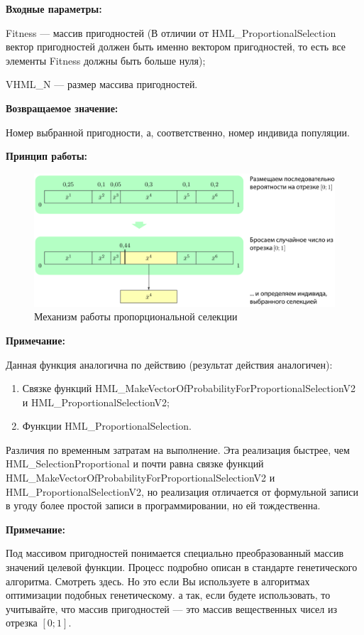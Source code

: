\textbf{Входные параметры:}
 
  Fitness --- массив пригодностей (В отличии от HML\_ProportionalSelection вектор пригодностей должен быть именно вектором пригодностей, то есть все элементы Fitness должны быть больше нуля);
  
 VHML\_N --- размер массива пригодностей.

\textbf{Возвращаемое значение:} 

Номер выбранной пригодности, а, соответственно, номер индивида популяции.

 \textbf{Принцип работы:}

\begin{figure} [h]
  \center
  \includegraphics [scale=0.8] {HML_ProportionalSelection_Sheme}
  \caption{Механизм работы пропорциональной селекции} 
  \label{img:HML_ProportionalSelection_Sheme}  
\end{figure}

\textbf{Примечание:}

Данная функция аналогична по действию (результат действия аналогичен):
 
 \begin{enumerate}
\item Связке функций HML\_MakeVectorOfProbabilityForProportionalSelectionV2 и HML\_ProportionalSelectionV2;
\item Функции HML\_ProportionalSelection.
 \end{enumerate}
 
 Различия по временным затратам на выполнение. Эта реализация быстрее, чем HML\_SelectionProportional
 и почти равна связке функций HML\_MakeVectorOfProbabilityForProportionalSelectionV2 и HML\_ProportionalSelectionV2,
 но реализация отличается от формульной записи в угоду более простой записи в программировании, но ей тождественна.
  
\textbf{Примечание:}

Под массивом пригодностей понимается специально преобразованный массив значений целевой функции. Процесс подробно описан в стандарте генетического алгоритма. Смотреть здесь. Но это если Вы используете в алгоритмах оптимизации подобных генетическому. а так, если будете использовать, то учитывайте, что массив пригодностей --- это массив вещественных чисел из отрезка $[0;1]$.

